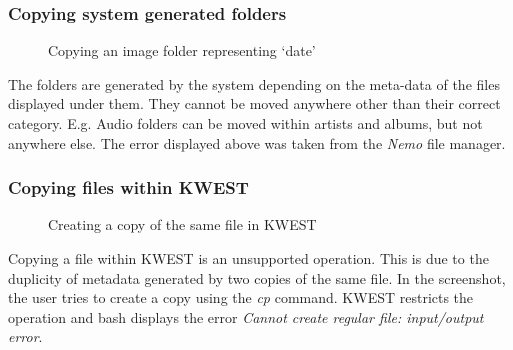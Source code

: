 \subsubsection{Copying system generated folders}
\begin{figure}[htb]
\centering
\setlength\fboxsep{0pt}
\setlength\fboxrule{0.5pt}
\caption{Copying an image folder representing `date'}
\label{fig:dfd0}
\end{figure}
The folders are generated by the system depending on the meta-data of the files displayed under them. They cannot be moved anywhere other than their correct category. E.g. Audio folders can be moved within artists and albums, but not anywhere else. The error displayed above was taken from the \emph{Nemo} file manager.

\subsubsection{Copying files within KWEST}
\begin{figure}[htb]
\centering
\setlength\fboxsep{0pt}
\setlength\fboxrule{0.5pt}
\caption{Creating a copy of the same file in KWEST}
\label{fig:dfd0}
\end{figure}
Copying a file within KWEST is an unsupported operation. This is due to the duplicity of metadata generated by two copies of the same file. In the screenshot, the user tries to create a copy using the \emph{cp} command. KWEST restricts the operation and bash displays the error \emph{Cannot create regular file: input/output error}.

